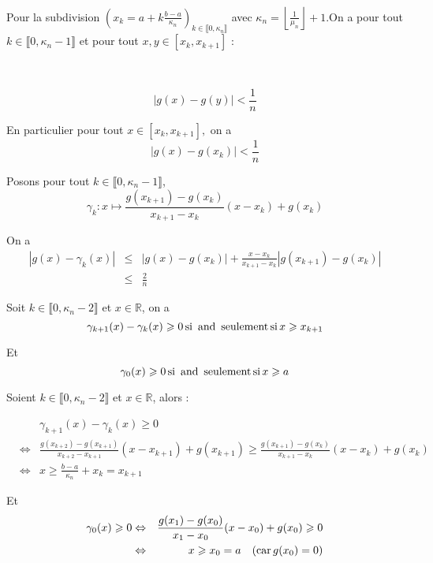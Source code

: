 Pour la subdivision $\left( x_k = a + k \frac{b - a}{\kappa_n} \right)_{k \in
\llbracket 0, \kappa_n \rrbracket}$ avec $\kappa_n = \left\lfloor
\frac{1}{\mu_n} \right\rfloor + 1$.\quad On a pour tout $k \in \llbracket 0,
\kappa_n - 1 \rrbracket$ et pour tout $x, y \in [x_k, x_{k + 1}]$ :

\


\[ | g (x) - g (y) | < \frac{1}{n} \]


En particulier pour tout $x \in [x_k, x_{k + 1}],$ on a
\[ | g (x) - g (x_k) | < \frac{1}{n} \]


Posons pour tout $k \in \llbracket 0, \kappa_n - 1 \rrbracket$,
\[ \gamma_k : x \longmapsto \frac{g (x_{k + 1}) - g (x_k)}{x_{k + 1} - x_k}
   (x - x_k) + g (x_k) \]


On a
\begin{eqnarray*}
  | g (x) - \gamma_k (x) | & \leqslant & | g (x) - g (x_k) | + \frac{x -
  x_k}{x_{k + 1} - x_k} | g (x_{k + 1}) - g (x_k) |\\
  & \leqslant & \frac{2}{n}
\end{eqnarray*}



Soit $k \in \llbracket 0, \kappa_n - 2 \rrbracket$ et $x \in \mathbb{R}$, on a
\[ \gamma_{k + 1} (x) - \gamma_k (x) \geqslant 0 \operatorname{si} \text{ and }
   \operatorname{seulement} \operatorname{si} x \geqslant x_{k + 1} \]


Et
\[ \gamma_0 (x) \geqslant 0 \operatorname{si} \text{ and } \operatorname{seulement} \operatorname{si} x
   \geqslant a \]



Soient $k \in \llbracket 0, \kappa_n - 2 \rrbracket$ et $x \in \mathbb{R}$,
alors :


\begin{eqnarray*}
  &  & \gamma_{k + 1} (x) - \gamma_k (x) \geqslant 0\\
  & \Leftrightarrow & \frac{g (x_{k + 2}) - g (x_{k + 1})}{x_{k + 2} - x_{k +
  1}} (x - x_{k + 1}) + g (x_{k + 1}) \geqslant \frac{g (x_{k + 1}) - g
  (x_k)}{x_{k + 1} - x_k} (x - x_k) + g (x_k)\\
  & \Leftrightarrow & x \geqslant \frac{b - a}{\kappa_n} + x_k = x_{k + 1}
\end{eqnarray*}


Et
\begin{eqnarray*}
  \gamma_0 (x) \geqslant 0 & \Leftrightarrow & \frac{g (x_1) - g (x_0)}{x_1 -
  x_0} (x - x_0) + g (x_0) \geqslant 0\\
  & \Leftrightarrow & x \geqslant x_0 = a \quad (\operatorname{car} g (x_0) = 0)
\end{eqnarray*}


